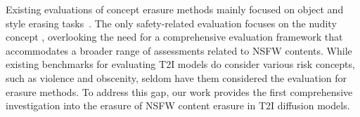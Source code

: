 Existing evaluations of concept erasure methods mainly focused on object and style erasing tasks~\cite{zhang2024unlearncanvas,moon2024holistic}. The only safety-related evaluation focuses on the nudity concept \cite{lyu2024one-spm,fan2023salun}, overlooking the need for a comprehensive evaluation framework that accommodates a broader range of assessments related to NSFW contents.
While existing benchmarks \cite{qu2023unsafe} for evaluating T2I models do consider various risk concepts, such as violence and obscenity, 
seldom have them considered the evaluation for erasure methods.
To address this gap, our work provides the first comprehensive investigation into the erasure of NSFW content erasure in T2I diffusion models.



